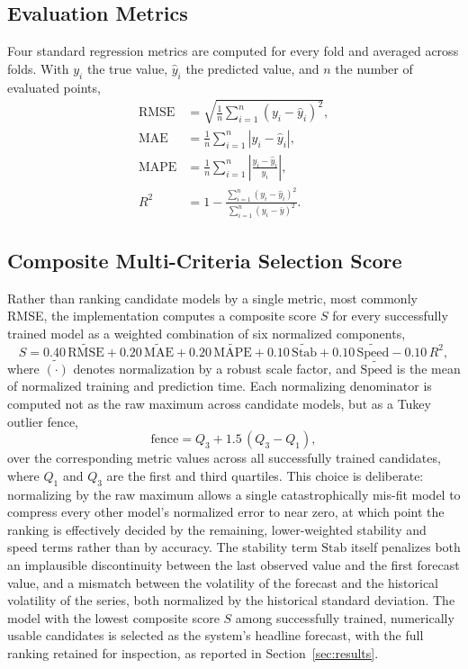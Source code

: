 \subsection{Evaluation Metrics}
\label{subsec:metrics}
Four standard regression metrics are computed for every fold and averaged across folds. With $y_i$ the true value, $\hat{y}_i$ the predicted value, and $n$ the number of evaluated points,
\begin{align}
\text{RMSE} &= \sqrt{\frac{1}{n}\sum_{i=1}^{n}(y_i-\hat{y}_i)^2}, \label{eq:rmse}\\
\text{MAE} &= \frac{1}{n}\sum_{i=1}^{n}|y_i-\hat{y}_i|, \label{eq:mae}\\
\text{MAPE} &= \frac{1}{n}\sum_{i=1}^{n}\left|\frac{y_i-\hat{y}_i}{y_i}\right|, \label{eq:mape}\\
R^2 &= 1 - \frac{\sum_{i=1}^n (y_i-\hat{y}_i)^2}{\sum_{i=1}^n (y_i-\bar{y})^2}. \label{eq:r2}
\end{align}

\subsection{Composite Multi-Criteria Selection Score}
\label{subsec:composite-score}
Rather than ranking candidate models by a single metric, most commonly RMSE, the implementation computes a composite score $S$ for every successfully trained model as a weighted combination of six normalized components,
\begin{equation}
\label{eq:composite-score}
S = 0.40\,\widetilde{\text{RMSE}} + 0.20\,\widetilde{\text{MAE}} + 0.20\,\widetilde{\text{MAPE}} + 0.10\,\widetilde{\text{Stab}} + 0.10\,\widetilde{\text{Speed}} - 0.10\,R^2,
\end{equation}
where $\widetilde{(\cdot)}$ denotes normalization by a robust scale factor, and $\widetilde{\text{Speed}}$ is the mean of normalized training and prediction time. Each normalizing denominator is computed not as the raw maximum across candidate models, but as a Tukey outlier fence,
\begin{equation}
\label{eq:tukey-fence}
\text{fence} = Q_3 + 1.5\,(Q_3-Q_1),
\end{equation}
over the corresponding metric values across all successfully trained candidates, where $Q_1$ and $Q_3$ are the first and third quartiles. This choice is deliberate: normalizing by the raw maximum allows a single catastrophically mis-fit model to compress every other model's normalized error to near zero, at which point the ranking is effectively decided by the remaining, lower-weighted stability and speed terms rather than by accuracy. The stability term $\text{Stab}$ itself penalizes both an implausible discontinuity between the last observed value and the first forecast value, and a mismatch between the volatility of the forecast and the historical volatility of the series, both normalized by the historical standard deviation. The model with the lowest composite score $S$ among successfully trained, numerically usable candidates is selected as the system's headline forecast, with the full ranking retained for inspection, as reported in Section~\ref{sec:results}.
